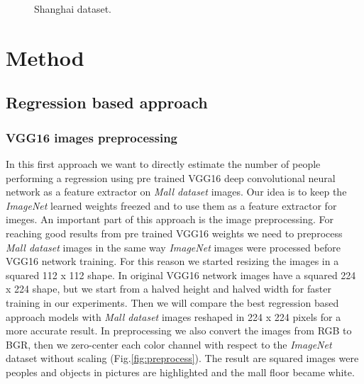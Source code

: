 \documentclass[10pt,twocolumn,letterpaper]{article}
\begin{document}
\begin{figure}[h!]%
	\centering
	\qquad
	\caption{Shanghai dataset.}
\end{figure}

\section{Method}
\subsection{Regression based approach}

\subsubsection{VGG16 images preprocessing}

In this first approach we want to directly estimate the number of people performing a regression using pre trained VGG16 deep convolutional neural network \cite{simonyan2014very} as a feature extractor on \textit{Mall dataset} images. Our idea is to keep the \textit{ImageNet} learned weights freezed and to use them as a feature extractor for imeges. An important part of this approach is the image preprocessing. For reaching good results from pre trained VGG16 weights we need to preprocess \textit{Mall dataset} images in the same way \textit{ImageNet} images were processed before VGG16 network training. For this reason we started resizing the images in a squared 112 x 112 shape. In original VGG16 network images have a squared 224 x 224 shape, but we start from a halved height and halved width for faster training in our experiments. Then we will compare the best regression based approach models with \textit{Mall dataset} images reshaped in 224 x 224 pixels for a more accurate result. In preprocessing we also convert the images from RGB to BGR, then we zero-center each color channel with respect to the \textit{ImageNet} dataset without scaling (Fig.\ref{fig:preprocess}). The result are squared images were peoples and objects in pictures are highlighted and the mall floor became white.
\end{document}
